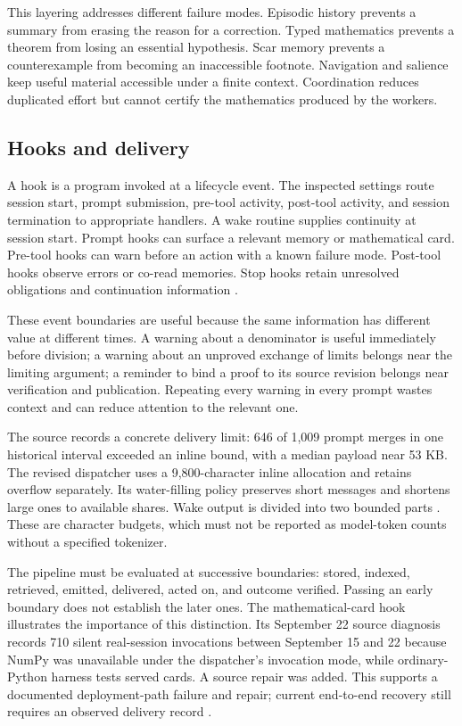 This layering addresses different failure modes. Episodic history prevents a summary from erasing the reason for a correction. Typed mathematics prevents a theorem from losing an essential hypothesis. Scar memory prevents a counterexample from becoming an inaccessible footnote. Navigation and salience keep useful material accessible under a finite context. Coordination reduces duplicated effort but cannot certify the mathematics produced by the workers.

\subsection{Hooks and delivery}

A hook is a program invoked at a lifecycle event. The inspected settings route session start, prompt submission, pre-tool activity, post-tool activity, and session termination to appropriate handlers. A wake routine supplies continuity at session start. Prompt hooks can surface a relevant memory or mathematical card. Pre-tool hooks can warn before an action with a known failure mode. Post-tool hooks observe errors or co-read memories. Stop hooks retain unresolved obligations and continuation information \citep{dispatcher,wake,instincts,mathsense,proofhooks}.

These event boundaries are useful because the same information has different value at different times. A warning about a denominator is useful immediately before division; a warning about an unproved exchange of limits belongs near the limiting argument; a reminder to bind a proof to its source revision belongs near verification and publication. Repeating every warning in every prompt wastes context and can reduce attention to the relevant one.

The source records a concrete delivery limit: 646 of 1,009 prompt merges in one historical interval exceeded an inline bound, with a median payload near 53 KB. The revised dispatcher uses a 9,800-character inline allocation and retains overflow separately. Its water-filling policy preserves short messages and shortens large ones to available shares. Wake output is divided into two bounded parts \citep{dispatcher,wake}. These are character budgets, which must not be reported as model-token counts without a specified tokenizer.

The pipeline must be evaluated at successive boundaries: stored, indexed, retrieved, emitted, delivered, acted on, and outcome verified. Passing an early boundary does not establish the later ones. The mathematical-card hook illustrates the importance of this distinction. Its September 22 source diagnosis records 710 silent real-session invocations between September 15 and 22 because NumPy was unavailable under the dispatcher's invocation mode, while ordinary-Python harness tests served cards. A source repair was added. This supports a documented deployment-path failure and repair; current end-to-end recovery still requires an observed delivery record \citep{mathsense}.

